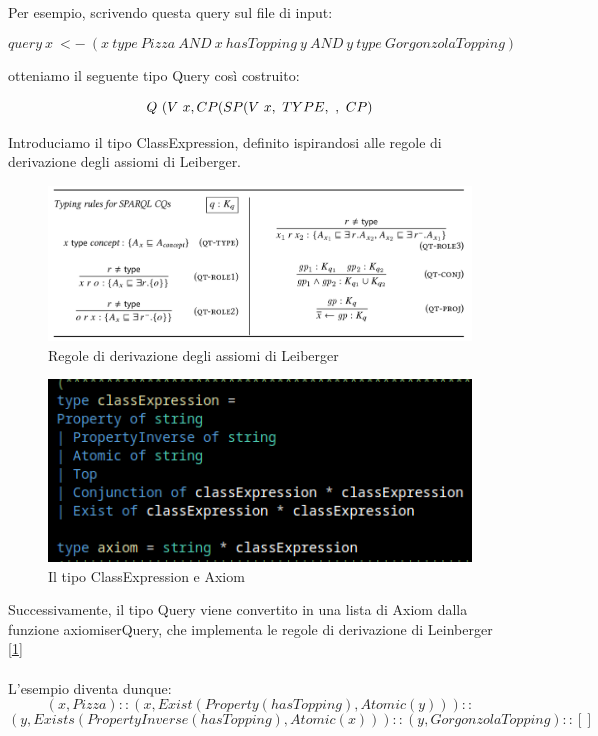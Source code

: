 Per esempio, scrivendo questa query sul file di input:

\[ query \ x \ <- \ (x \ type \ Pizza \ AND \ x \ hasTopping \ y \ AND \ y \ type \ GorgonzolaTopping) \]

otteniamo il seguente tipo Query così costruito: 

\[ Q \  (V \ x, \\
    CP(SP(V \ x,\ TYPE, \ ,\ CP)\]

Introduciamo il tipo ClassExpression, definito ispirandosi alle regole di derivazione degli assiomi di Leiberger.
\begin{figure}[H]
    \centering
    \includegraphics[width=\textwidth]{pictures/leinbergAxiom.png}
    \caption{Regole di derivazione degli assiomi di Leiberger}
    \label{fig:leinbergerAxiom}
\end{figure}

\begin{figure}[H]
    \centering
    \includegraphics[width=\textwidth]{pictures/classExpressionType.png}
    \caption{Il tipo ClassExpression e Axiom}
    \label{fig:enter-label}
\end{figure}
Successivamente, il tipo Query viene convertito in una lista di Axiom dalla funzione axiomiserQuery, che implementa le regole di derivazione di Leinberger [\ref{fig:leinbergerAxiom}]\\ \\L'esempio diventa dunque:
\[ (x, Pizza) :: (x, Exist(Property(hasTopping),Atomic(y))) :: \]\[ (y, Exists(PropertyInverse(hasTopping), Atomic(x))) ::
      (y, GorgonzolaTopping) :: []
 \]
        

